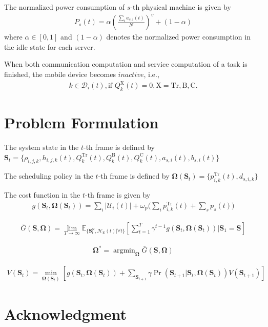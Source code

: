\documentclass[12pt, draftclsnofoot, onecolumn]{IEEEtran}
\begin{document}
The normalized power consumption of $s$-th physical machine is given by
\begin{align}
	P_{s}(t)= \alpha\left(\frac{\sum_{i}a_{s,i}(t)}{N}\right)^{v}+(1-\alpha)
\end{align}
where $\alpha\in[0,1]$ and $(1-\alpha)$ denotes the normalized power consumption in the idle state for each server.

When both communication computation and service computation of a task is finished, the mobile device becomes $\textit{inactive}$, i.e.,
\begin{align}
	k\in\mathcal{D}_{i}(t),\text{if }Q_{k}^{\mathrm{X}}(t)=0,\mathrm{X}=\mathrm{Tr},\mathrm{B},\mathrm{C}.
\end{align}

\section{Problem Formulation}
The system state in the $t$-th frame is defined by \\
$\mathbf{S}_{t}=\{\rho_{i,j,k},h_{i,j,k}(t),Q_{k}^{\mathrm{Tr}}(t),Q_{k}^{\mathrm{B}}(t),Q_{k}^{\mathrm{C}}(t),a_{s,i}(t),b_{s,i}(t)\}$

The scheduling policy in the $t$-th frame is defined by $\mathbf{\Omega}(\mathbf{S}_{t})=\{p_{i,k}^{\mathrm{Tr}}(t),d_{s,i,k}\}$

The cost function in the $t$-th frame is given by
\begin{align}
	g(\mathbf{S}_{t},\mathbf{\Omega}(\mathbf{S}_{t}))=\sum_{i}|\mathcal{U}_{i}(t)|+\omega_{\mathrm{p}}\bigg(\sum_{i}p_{i,k}^{\mathrm{Tr}}(t)+\sum_{s}p_{s}(t)\bigg)
\end{align}

\begin{align}
	\bar{G}(\mathbf{S},\mathbf{\Omega})=\lim_{T\to\infty}\mathbb{E}_{\{\mathbf{S}_{t}^{\mathrm{N}},\mathcal{H}_{\mathrm{E}}(t)|\forall t\}}\left[\sum_{t=1}^{T}\gamma^{t-1}g(\mathbf{S}_{t},\mathbf{\Omega}(\mathbf{S}_{t}))|\mathbf{S}_{1}=\mathbf{S}\right]
\end{align}

\begin{align}
	\mathbf{\Omega}^{*}=\mathop{\arg\min}_{\mathbf{\Omega}}\bar{G}(\mathbf{S},\mathbf{\Omega})
\end{align}

\begin{align}
	V(\mathbf{S}_{t})=\min_{\mathbf{\Omega}(\mathbf{S}_{t})}\left[g(\mathbf{S}_{t},\mathbf{\Omega}(\mathbf{S}_{t}))+\sum_{\mathbf{S}_{t+1}}\gamma\Pr(\mathbf{S}_{t+1}|\mathbf{S}_{t},\mathbf{\Omega}(\mathbf{S}_{t}))V(\mathbf{S}_{t+1})\right]
\end{align}


\appendices
\section*{Acknowledgment}


\end{document}
